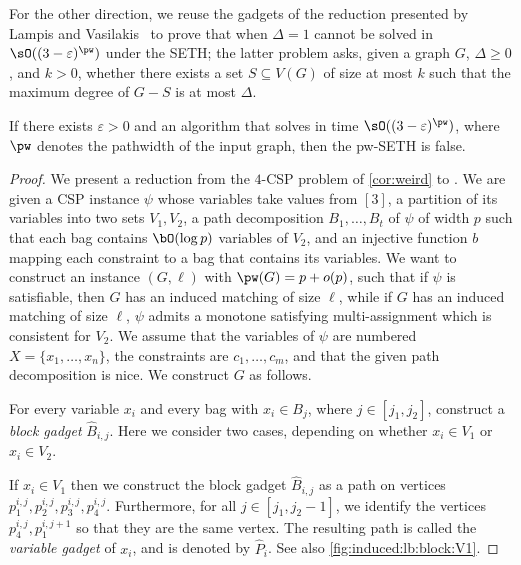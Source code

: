For the other direction, we reuse the gadgets of the reduction presented by Lampis and Vasilakis~\cite{toct/LampisV24}
to prove that {\BDD} when $\Delta = 1$ cannot be solved in $\sO((3-\varepsilon)^{\pw})$ under the SETH;
the latter problem asks, given a graph $G$, $\Delta \ge 0$, and $k>0$,
whether there exists a set $S \subseteq V(G)$ of size at most $k$
such that the maximum degree of $G-S$ is at most $\Delta$.

\begin{lemmarep}[\appsymb]\label{lem:induced:lb:CSP->Induced}
    If there exists $\varepsilon>0$ and an algorithm that solves {\InducedM}
    in time $\sO((3-\varepsilon)^\pw)$,
    where $\pw$ denotes the pathwidth of the input graph,
    then the pw-SETH is false.
\end{lemmarep}


\begin{proof}
    We present a reduction from the $4$-CSP problem of \cref{cor:weird} to \InducedM.
    We are given a \textsc{CSP} instance $\psi$ whose variables take values from $[3]$,
    a partition of its variables into two sets $V_1, V_2$,
    a path decomposition $B_1, \ldots, B_t$ of $\psi$ of width $p$
    such that each bag contains $\bO(\log p)$ variables of $V_2$,
    and an injective function $b$ mapping each constraint to a bag that contains its variables.
    We want to construct an {\InducedM} instance $(G,\ell)$ with $\pw(G) = p + o(p)$,
    such that if $\psi$ is satisfiable, then $G$ has an induced matching of size $\ell$,
    while if $G$ has an induced matching of size $\ell$,
    $\psi$ admits a monotone satisfying multi-assignment which is consistent for $V_2$.
    We assume that the variables of $\psi$ are numbered $X = \{ x_1,\ldots, x_n \}$,
    the constraints are $c_1, \ldots, c_m$,
    and that the given path decomposition is nice.
    We construct $G$ as follows.


    For every variable $x_i$ and every bag with $x_i \in B_j$, where $j \in [j_1,j_2]$,
    construct a \emph{block gadget} $\hat{B}_{i,j}$.
    Here we consider two cases, depending on whether $x_i \in V_1$ or $x_i \in V_2$.

    If $x_i \in V_1$ then we construct the block gadget $\hat{B}_{i,j}$ as a path on vertices $p^{i,j}_1, p^{i,j}_2,p^{i,j}_3,p^{i,j}_4$.
    Furthermore, for all $j \in [j_1,j_2-1]$, we identify the vertices $p^{i,j}_4, p^{i,j+1}_1$ so that they are the same vertex.
    The resulting path is called the \emph{variable gadget} of $x_i$, and is denoted by $\hat{P}_i$.
    See also \cref{fig:induced:lb:block:V1}.


\end{proof}
